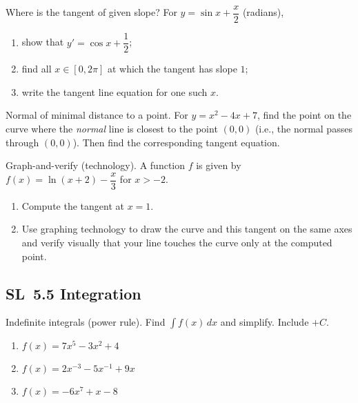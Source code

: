 \documentclass[11pt]{article}
\def\textbf#1{#1}%
\newcommand{\tocsubsection}[1]{\subsection{#1}}
\newcounter{question}
\begin{document}
\begin{question}
\textbf{Where is the tangent of given slope?}
For $y=\sin x+\dfrac{x}{2}$ (radians),
\begin{enumerate}
  \item show that $y'= \cos x+\dfrac12$;
  \item find all $x\in[0,2\pi]$ at which the tangent has slope $1$;
  \item write the tangent line equation for one such $x$.
\end{enumerate}
\end{question}

\begin{question}
\textbf{Normal of minimal distance to a point.}
For $y=x^2-4x+7$, find the point on the curve where the \emph{normal} line is closest to the point $(0,0)$ (i.e., the normal passes through $(0,0)$). Then find the corresponding tangent equation.
\end{question}

\begin{question}
\textbf{Graph-and-verify (technology).}
A function $f$ is given by $f(x)=\ln(x+2)-\dfrac{x}{3}$ for $x>-2$.
\begin{enumerate}
  \item Compute the tangent at $x=1$.
  \item Use graphing technology to draw the curve and this tangent on the same axes and verify visually that your line touches the curve only at the computed point.
\end{enumerate}
\end{question}




\tocsubsection{SL 5.5 \; Integration}


\begin{question}
\textbf{Indefinite integrals (power rule).}
Find $\displaystyle\int f(x)\,dx$ and simplify. Include $+C$.
\begin{enumerate}
  \item $f(x)=7x^{5}-3x^{2}+4$
  \item $f(x)=2x^{-3}-5x^{-1}+9x$
  \item $f(x)=-6x^{7}+x-8$
\end{enumerate}
\end{question}
\end{document}
